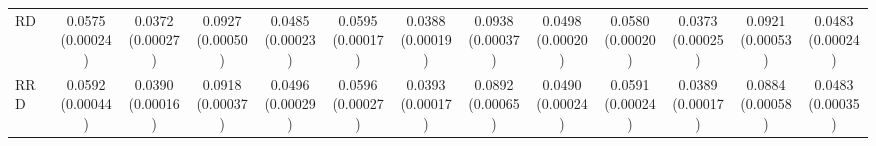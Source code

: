 \begin{table}[t]
\begin{tabular}{lcccccccccccc}
RD & \shortstack[c]{0.0575\\[-1pt]{\tiny(0.00024)}} & \shortstack[c]{0.0372\\[-1pt]{\tiny(0.00027)}} & \shortstack[c]{0.0927\\[-1pt]{\tiny(0.00050)}} & \shortstack[c]{0.0485\\[-1pt]{\tiny(0.00023)}} & \shortstack[c]{0.0595\\[-1pt]{\tiny(0.00017)}} & \shortstack[c]{0.0388\\[-1pt]{\tiny(0.00019)}} & \shortstack[c]{0.0938\\[-1pt]{\tiny(0.00037)}} & \shortstack[c]{0.0498\\[-1pt]{\tiny(0.00020)}} & \shortstack[c]{0.0580\\[-1pt]{\tiny(0.00020)}} & \shortstack[c]{0.0373\\[-1pt]{\tiny(0.00025)}} & \shortstack[c]{0.0921\\[-1pt]{\tiny(0.00053)}} & \shortstack[c]{0.0483\\[-1pt]{\tiny(0.00024)}} \\
RRD & \shortstack[c]{0.0592\\[-1pt]{\tiny(0.00044)}} & \shortstack[c]{0.0390\\[-1pt]{\tiny(0.00016)}} & \shortstack[c]{0.0918\\[-1pt]{\tiny(0.00037)}} & \shortstack[c]{0.0496\\[-1pt]{\tiny(0.00029)}} & \shortstack[c]{0.0596\\[-1pt]{\tiny(0.00027)}} & \shortstack[c]{0.0393\\[-1pt]{\tiny(0.00017)}} & \shortstack[c]{0.0892\\[-1pt]{\tiny(0.00065)}} & \shortstack[c]{0.0490\\[-1pt]{\tiny(0.00024)}} & \shortstack[c]{0.0591\\[-1pt]{\tiny(0.00024)}} & \shortstack[c]{0.0389\\[-1pt]{\tiny(0.00017)}} & \shortstack[c]{0.0884\\[-1pt]{\tiny(0.00058)}} & \shortstack[c]{0.0483\\[-1pt]{\tiny(0.00035)}} \\

\end{tabular}
\end{table}
